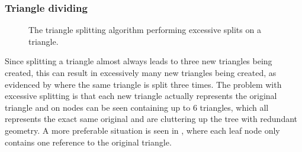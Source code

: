 \subsubsection{Triangle dividing}

\begin{figure}
  \centering

  \vspace{3mm}
  \parbox{8cm}{\caption[Excessive splitting of a triangle.]{The triangle splitting
      algorithm performing excessive splits on a triangle.}\label{fig:excessiveSplitting}}
\end{figure}

Since splitting a triangle almost always leads to three new triangles being
created, this can result in excessively many new triangles being created, as
evidenced by  where the same triangle is split
three times. The problem with excessive splitting is that each new triangle
actually represents the original triangle and on 
nodes can be seen containing up to 6 triangles, which all represents the exact
same original and are cluttering up the tree with redundant geometry. A more
preferable situation is seen in , where each leaf node only
contains one reference to the original triangle.

